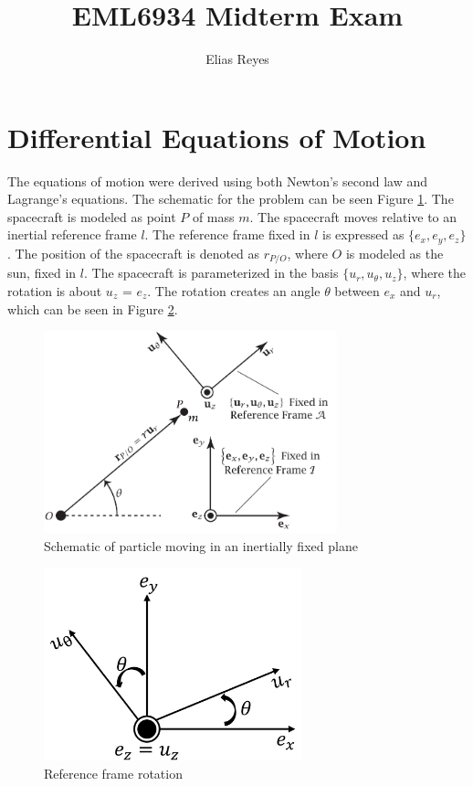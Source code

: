 \documentclass[]{article}
\title{EML6934 Midterm Exam}
\author{Elias Reyes}
\begin{document}
\maketitle



\section{Differential Equations of Motion}
The equations of motion were derived using both Newton's second law and Lagrange's equations. The schematic for the problem can be seen Figure \ref{fig:schematic}. The spacecraft is modeled as point \(P\) of  mass \(m\). The spacecraft moves relative to an inertial reference frame \(l\). The reference frame fixed in \(l\) is expressed as \(\{e_{x},e_{y},e_{z}\}\). The position of the spacecraft is denoted as \(r_{P/O}\), where \(O\) is modeled as the sun, fixed in \(l\). The spacecraft is parameterized in the basis \(\{u_{r},u_{\theta},u_{z}\}\), where the rotation is about \(u_{z}\) = \(e_{z}\). The rotation creates an angle \(\theta\) between \(e_{x}\) and \(u_{r}\), which can be seen in Figure \ref{fig:rotation2}.
\vspace{2mm}\newline
\begin{figure}
	\centering
    \includegraphics[width=85mm,scale=0.85]{midterm_schematic.png}
	\caption{Schematic of particle moving in an inertially fixed plane}
	\label{fig:schematic}
\end{figure}
\begin{figure}
	\centering
	\includegraphics[width=75mm,scale=0.75]{rotation.png}
	\caption{Reference frame rotation}
	\label{fig:rotation2}
\end{figure}
\end{document}
